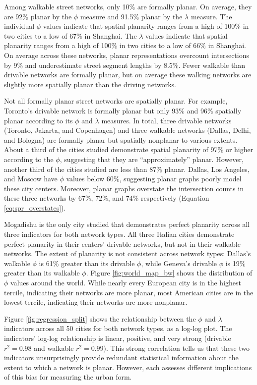 \documentclass[Afour,sageh,times]{sagej}
\begin{document}
Among walkable street networks, only 10\% are formally planar. On average, they are 92\% planar by the $\phi$ measure and 91.5\% planar by the $\lambda$ measure. The individual $\phi$ values indicate that spatial planarity ranges from a high of 100\% in two cities to a low of 67\% in Shanghai. The $\lambda$ values indicate that spatial planarity ranges from a high of 100\% in two cities to a low of 66\% in Shanghai. On average across these networks, planar representations overcount intersections by 9\% and underestimate street segment lengths by 8.5\%. Fewer walkable than drivable networks are formally planar, but on average these walking networks are slightly more spatially planar than the driving networks.

Not all formally planar street networks are spatially planar. For example, Toronto's drivable network is formally planar but only 93\% and 96\% spatially planar according to its $\phi$ and $\lambda$ measures. In total, three drivable networks (Toronto, Jakarta, and Copenhagen) and three walkable networks (Dallas, Delhi, and Bologna) are formally planar but spatially nonplanar to various extents. About a third of the cities studied demonstrate spatial planarity of 97\% or higher according to the $\phi$, suggesting that they are \enquote{approximately} planar. However, another third of the cities studied are less than 87\% planar. Dallas, Los Angeles, and Moscow have $\phi$ values below 60\%, suggesting planar graphs poorly model these city centers. Moreover, planar graphs overstate the intersection counts in these three networks by 67\%, 72\%, and 74\% respectively (Equation \ref{eq:spr_overstates}).

Mogadishu is the only city studied that demonstrates perfect planarity across all three indicators for both network types. All three Italian cities demonstrate perfect planarity in their centers' drivable networks, but not in their walkable networks. The extent of planarity is not consistent across network types: Dallas's walkable $\phi$ is 61\% greater than its drivable $\phi$, while Geneva's drivable $\phi$ is 19\% greater than its walkable $\phi$. Figure \ref{fig:world_map_bw} shows the distribution of $\phi$ values around the world. While nearly every European city is in the highest tercile, indicating their networks are more planar, most American cities are in the lowest tercile, indicating their networks are more nonplanar.

Figure \ref{fig:regression_split} shows the relationship between the $\phi$ and $\lambda$ indicators across all 50 cities for both network types, as a log-log plot. The indicators' log-log relationship is linear, positive, and very strong (drivable $r^2=0.98$ and walkable $r^2=0.99$). This strong correlation tells us that these two indicators unsurprisingly provide redundant statistical information about the extent to which a network is planar. However, each assesses different implications of this bias for measuring the urban form.
\end{document}
